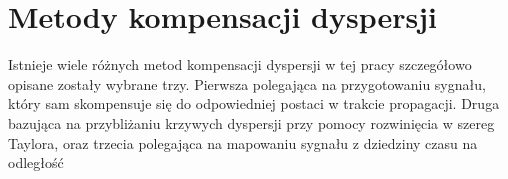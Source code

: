 
\chapter{Metody kompensacji dyspersji}
\label{cha:comp_disp}
 
Istnieje wiele różnych metod kompensacji dyspersji w tej pracy szczegółowo opisane zostały wybrane trzy. Pierwsza polegająca na przygotowaniu sygnału, który sam skompensuje się do odpowiedniej postaci w trakcie propagacji. Druga bazująca na przybliżaniu krzywych dyspersji przy pomocy rozwinięcia w szereg Taylora, oraz trzecia polegająca na mapowaniu sygnału z dziedziny czasu na odległość 
 




%
%
%
